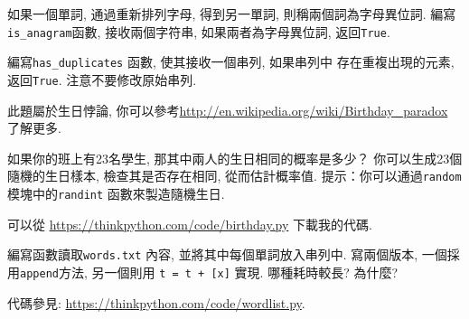 \documentclass[10pt]{book}
\begin{document}
\begin{exercise}
\label{anagram}

如果一個單詞, 通過重新排列字母, 得到另一單詞, 則稱兩個詞為字母異位詞. 
編寫\verb"is_anagram"函數, 接收兩個字符串, 如果兩者為字母異位詞, 返回{\tt True}.
\end{exercise}



\begin{exercise}
\label{duplicate}

編寫\verb"has_duplicates" 函數, 使其接收一個串列, 如果串列中
存在重複出現的元素, 返回{\tt True}. 注意不要修改原始串列.

\end{exercise}


\begin{exercise}

此題屬於生日悖論, 你可以參考\url{http://en.wikipedia.org/wiki/Birthday_paradox}
了解更多.

如果你的班上有23名學生, 那其中兩人的生日相同的概率是多少？
你可以生成23個隨機的生日樣本, 檢查其是否存在相同, 從而估計概率值. 
提示：你可以通過{\tt random}模塊中的{\tt randint} 函數來製造隨機生日. 

可以從 \url{https://thinkpython.com/code/birthday.py} 下載我的代碼.

\end{exercise}


\begin{exercise}

編寫函數讀取{\tt words.txt} 內容, 並將其中每個單詞放入串列中. 
寫兩個版本, 一個採用{\tt append}方法, 另一個則用 {\tt t = t + [x]} 實現. 
哪種耗時較長? 為什麼?

代碼參見: \url{https://thinkpython.com/code/wordlist.py}.

\end{exercise}
\end{document}
